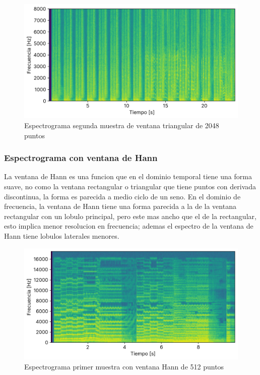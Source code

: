 \documentclass[12pt]{article}
\begin{document}
\begin{figure}[H]
\centering
\includegraphics{plot/cancion2_espectograma_bartlett_2048.png}
\caption{Espectrograma segunda muestra de ventana triangular de 2048 puntos}
\label{cancion2_espectograma_bartlett_2048}
\end{figure}

\hypertarget{espectograma-ventana-hann}{%
\subsubsection{Espectrograma con ventana de Hann}\label{espectograma-ventana-hann}}

La ventana de Hann es una funcion que en el dominio temporal tiene una forma
suave, no como la ventana rectangular o triangular que tiene puntos con derivada
discontinua, la forma es parecida a medio ciclo de un seno. En el dominio de
frecuencia, la ventana de Hann tiene una forma parecida a la de la ventana
rectangular con un lobulo principal, pero este mas ancho que el de la
rectangular, esto implica menor resolucion en frecuencia; ademas el espectro de
la ventana de Hann tiene lobulos laterales menores.

\begin{figure}[H]
\centering
\includegraphics{plot/cancion1_espectograma_hann_0512.png}
\caption{Espectrograma primer muestra con ventana Hann de 512 puntos}
\label{cancion1_espectograma_hann_0512}
\end{figure}
\end{document}
